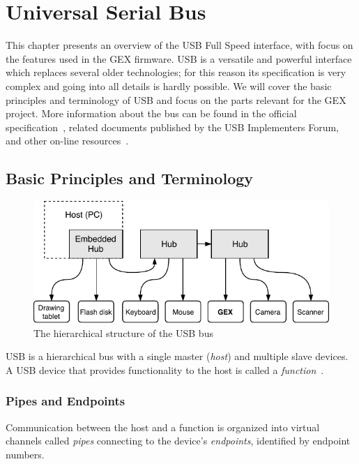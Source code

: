 \chapter{Universal Serial Bus}

This chapter presents an overview of the \acrfull{USB} Full Speed interface, with focus on the features used in the GEX firmware. \gls{USB} is a versatile and powerful interface which replaces several older technologies; for this reason its specification is very complex and going into all details is hardly possible. We will cover the basic principles and terminology of \gls{USB} and focus on the parts relevant for the GEX project. More information about the bus can be found in the official specification~\cite{usbif-spec}, related documents published by the USB Implementers Forum, and other on-line resources~\cite{usb-nutshell,usb-made-simple}.

\section{Basic Principles and Terminology}

\begin{figure}[h]
	\centering
	\includegraphics[scale=1] {img/usb-hierarchy-redraw.pdf}
	\caption[USB hierarchical structure]{\label{fig:usb_hierarchy}The hierarchical structure of the USB bus}
\end{figure}

\gls{USB} is a hierarchical bus with a single master (\textit{host}) and multiple slave devices. A \gls{USB} device that provides functionality to the host is called a \textit{function}~\cite{usb-function}.

\subsection{Pipes and Endpoints}

Communication between the host and a function is organized into virtual channels called \textit{pipes} connecting to the device's \textit{endpoints}, identified by endpoint numbers.

